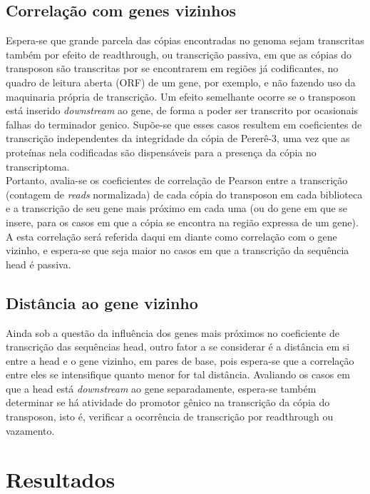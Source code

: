 \documentclass[12pt]{article}
\begin{document}
\begin{multicols}{2}
\subsection{Correlação com genes vizinhos}
	Espera-se que grande parcela das cópias encontradas no genoma sejam transcritas também por efeito de readthrough, ou transcrição passiva, em que as cópias do transposon são transcritas por se encontrarem em regiões já codificantes, no quadro de leitura aberta (ORF) de um gene, por exemplo, e não fazendo uso da maquinaria própria de transcrição. Um efeito semelhante ocorre se o transposon está inserido \textit{downstream} ao gene, de forma a poder ser transcrito por ocasionais falhas do terminador genico. Supõe-se que esses casos resultem em coeficientes de transcrição independentes da integridade da cópia de Pererê-3, uma vez que as proteínas nela codificadas são dispensáveis para a presença da cópia no transcriptoma.\\

	Portanto, avalia-se os coeficientes de correlação de Pearson entre a transcrição (contagem de \textit{reads} normalizada) de cada cópia do transposon em cada biblioteca e a transcrição de seu gene mais próximo em cada uma (ou do gene em que se insere, para os casos em que a cópia se encontra na região expressa de um gene). A esta correlação será referida daqui em diante como correlação com o gene vizinho, e espera-se que seja maior no casos em que a transcrição da sequência head é passiva.

\subsection{Distância ao gene vizinho}
	Ainda sob a questão da influência dos genes mais próximos no coeficiente de transcrição das sequências head, outro fator a se considerar é a distância em si entre a head e o gene vizinho, em pares de base, pois espera-se que a correlação entre eles se intensifique quanto menor for tal distância. Avaliando os casos em que a head está \textit{downstream} ao gene separadamente, espera-se também determinar se há atividade do promotor gênico na transcrição da cópia do transposon, isto é, verificar a ocorrência de transcrição por readthrough ou vazamento.%


\section{Resultados}


\end{multicols}
\end{document}
